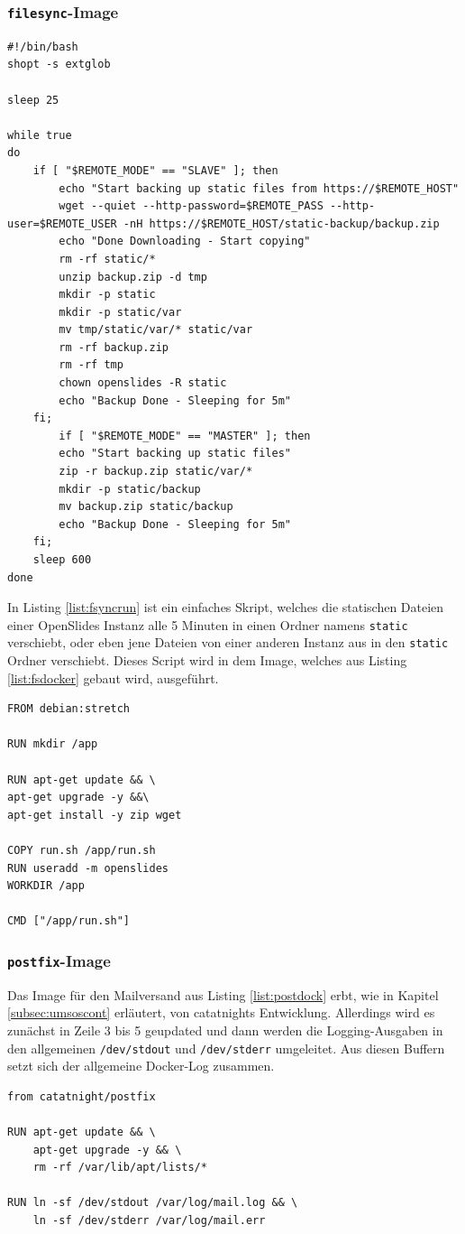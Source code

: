\documentclass[11pt,a4paper]{article}
\begin{document}
\subsubsection{\texttt{filesync}-Image}
\begin{lstlisting}[firstnumber=1,
	caption=run.sh für das \texttt{filesync}-Image - \cite{osdockcont},
	label={list:fsyncrun}]
#!/bin/bash
shopt -s extglob 

sleep 25

while true
do
	if [ "$REMOTE_MODE" == "SLAVE" ]; then
		echo "Start backing up static files from https://$REMOTE_HOST"
		wget --quiet --http-password=$REMOTE_PASS --http-user=$REMOTE_USER -nH https://$REMOTE_HOST/static-backup/backup.zip
		echo "Done Downloading - Start copying"
		rm -rf static/*
		unzip backup.zip -d tmp
		mkdir -p static
		mkdir -p static/var
		mv tmp/static/var/* static/var
		rm -rf backup.zip
		rm -rf tmp
		chown openslides -R static
		echo "Backup Done - Sleeping for 5m"
	fi;
		if [ "$REMOTE_MODE" == "MASTER" ]; then
		echo "Start backing up static files"
		zip -r backup.zip static/var/*
		mkdir -p static/backup
		mv backup.zip static/backup
		echo "Backup Done - Sleeping for 5m"
	fi;
	sleep 600
done
\end{lstlisting}
In Listing \ref{list:fsyncrun} ist ein einfaches Skript, welches die statischen 
Dateien einer OpenSlides Instanz alle 5 Minuten in einen Ordner namens 
\texttt{static} verschiebt, oder eben jene Dateien von einer anderen Instanz 
aus in den \texttt{static} Ordner verschiebt. Dieses Script wird in dem Image, 
welches aus Listing \ref{list:fsdocker} gebaut wird, ausgeführt.
\begin{lstlisting}[firstnumber=1,
	caption=Dockerfile für den Bau des \texttt{filesync} - \cite{osdockcont},
	label={list:fsdocker}]
FROM debian:stretch

RUN mkdir /app

RUN apt-get update && \
apt-get upgrade -y &&\
apt-get install -y zip wget 

COPY run.sh /app/run.sh
RUN useradd -m openslides
WORKDIR /app

CMD ["/app/run.sh"]
\end{lstlisting}
\newpage
\subsubsection{\texttt{postfix}-Image}
Das Image für den Mailversand aus Listing \ref{list:postdock} erbt, wie in 
Kapitel \ref{subsec:umsoscont} erläutert, von \glqq{}catatnight\grqq{}s 
Entwicklung\cite{postfixdock}. Allerdings wird es zunächst in Zeile 3 bis 5 
geupdated und dann werden die Logging-Ausgaben in den allgemeinen 
\texttt{/dev/stdout} und \texttt{/dev/stderr} umgeleitet. Aus diesen Buffern 
setzt sich der allgemeine Docker-Log zusammen.
\begin{lstlisting}[firstnumber=1,
	caption=Dockerfile für den Bau des \texttt{postgres} - \cite{osdockcont},
	label={list:postdock}]
from catatnight/postfix

RUN apt-get update && \
	apt-get upgrade -y && \
	rm -rf /var/lib/apt/lists/*

RUN ln -sf /dev/stdout /var/log/mail.log && \
	ln -sf /dev/stderr /var/log/mail.err
\end{lstlisting}
\end{document}
